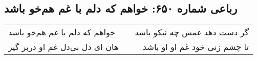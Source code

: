 \begin{center}
\section*{رباعی شماره ۶۵۰: خواهم که دلم با غم هم‌خو باشد}
\label{sec:0650}
\begin{longtable}{l p{0.5cm} r}
خواهم که دلم با غم هم‌خو باشد
&&
گر دست دهد غمش چه نیکو باشد
\\
هان ای دل بی‌دل غم او دربر گیر
&&
تا چشم زنی خود غم او او باشد
\\
\end{longtable}
\end{center}
